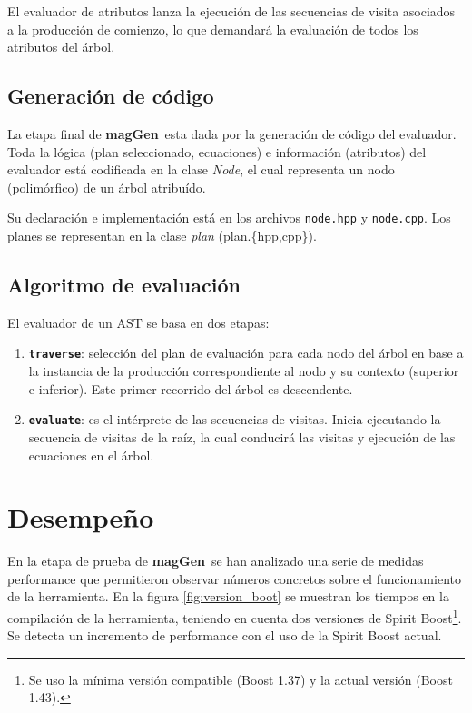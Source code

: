 \documentclass[a4paper]{article}
\newcommand{\textbtt}[1]{\texttt{\textbf{#1}}}
\newcommand{\maggen}{\textbf{magGen}}
\begin{document}
El evaluador de atributos lanza la ejecución de las secuencias de visita asociados a la producción de comienzo, lo que demandará la evaluación de todos los atributos del árbol.

\subsection{Generación de código}
\vspace{-0.22cm}

La etapa final de \maggen\ esta dada por la generación de código del evaluador. 
Toda la lógica (plan seleccionado, ecuaciones) e información (atributos) del evaluador está codificada en la clase \emph{Node}, el cual representa un nodo (polimórfico) de un árbol atribuído.

Su declaración e implementación está en los archivos \texttt{node.hpp} y \texttt{node.cpp}.
Los planes se representan en la clase \emph{plan} (plan.\{hpp,cpp\}).

\subsection{Algoritmo de evaluación}
\label{sec:codcppalgeval}

El evaluador de un AST se basa en dos etapas:

\begin{enumerate}

\item \textbtt{traverse}: selección del plan de evaluación para cada nodo del árbol en base
a la instancia de la producción correspondiente al nodo y su contexto (superior e inferior). Este primer recorrido del árbol es descendente.

\item \textbtt{evaluate}: es el intérprete de las secuencias de visitas. Inicia ejecutando
la secuencia de visitas de la raíz, la cual conducirá las visitas y ejecución de las ecuaciones en el árbol.

\end{enumerate}



\section{Desempeño}

En la etapa de prueba de \maggen\ se han analizado una serie de medidas performance que permitieron observar números concretos sobre el funcionamiento de la herramienta. En la figura \ref{fig:version_boot} se muestran los tiempos en la compilación de la herramienta, teniendo en cuenta dos versiones de Spirit Boost\footnote{Se uso la mínima versión compatible (Boost 1.37) y la actual versión (Boost 1.43).}. Se detecta un incremento de performance con el uso de la Spirit Boost actual.
\end{document}
